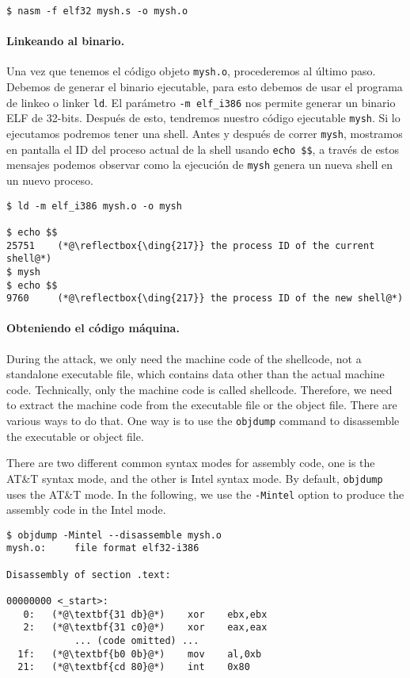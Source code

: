 \begin{lstlisting}
$ nasm -f elf32 mysh.s -o mysh.o
\end{lstlisting}


\paragraph{Linkeando al binario.}
Una vez que tenemos el código objeto \texttt{mysh.o}, procederemos al último paso. Debemos de generar el binario ejecutable, para esto debemos de usar el programa de linkeo o linker \texttt{ld}. El parámetro \texttt{-m elf\_i386} nos permite generar un binario ELF de 32-bits.
Después de esto, tendremos nuestro código ejecutable \texttt{mysh}. Si lo ejecutamos podremos tener una shell.
Antes y después de correr \texttt{mysh}, mostramos en pantalla el ID del proceso actual de la shell usando \texttt{echo \$\$}, a través de estos mensajes podemos observar como la ejecución de \texttt{mysh} genera un nueva shell en un nuevo proceso.

\begin{lstlisting}
$ ld -m elf_i386 mysh.o -o mysh

$ echo $$
25751    (*@\reflectbox{\ding{217}} the process ID of the current shell@*)
$ mysh
$ echo $$
9760     (*@\reflectbox{\ding{217}} the process ID of the new shell@*)
\end{lstlisting}



\paragraph{Obteniendo el código máquina.}
During the attack, we only need the machine code 
of the shellcode, not a standalone executable file, which
contains data other than the actual machine code. 
Technically, only the machine code is called shellcode. 
Therefore, we need to extract the machine
code from the executable file or the object file.
There are various ways to do that. One way is to 
use the \texttt{objdump} command to disassemble the 
executable or object file. 

There are two different common syntax modes for assembly code, 
one is the AT\&T syntax mode, and the other is 
Intel syntax mode. By default, \texttt{objdump} uses
the AT\&T mode. In the following, 
we use the \texttt{-Mintel} option to 
produce the assembly code in the Intel mode. 

\begin{lstlisting}
$ objdump -Mintel --disassemble mysh.o
mysh.o:     file format elf32-i386

Disassembly of section .text:

00000000 <_start>:
   0:	(*@\textbf{31 db}@*)    xor    ebx,ebx
   2:	(*@\textbf{31 c0}@*)    xor    eax,eax
            ... (code omitted) ...
  1f:	(*@\textbf{b0 0b}@*)    mov    al,0xb
  21:	(*@\textbf{cd 80}@*)    int    0x80
\end{lstlisting}
 
